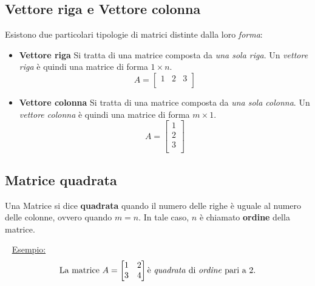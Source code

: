 \documentclass[12pt,oneside]{book}
\begin{document}
\subsection{Vettore riga e Vettore colonna}
Esistono due particolari tipologie di matrici distinte dalla loro \emph{forma}:
\begin{itemize}
    \item \textbf{Vettore riga} \newline
          Si tratta di una matrice composta da \emph{una sola riga}. Un \emph{vettore riga} è quindi una matrice
          di forma $1 \times n$.
          \begin{equation*}
              A =
              \begin{bmatrix}
                  1 & 2 & 3 \\
              \end{bmatrix}
          \end{equation*}
    \item \textbf{Vettore colonna} \newline
          Si tratta di una matrice composta da \emph{una sola colonna}. Un \emph{vettore colonna} è quindi una matrice
          di forma $m \times 1$.
          \begin{equation*}
              A =
              \begin{bmatrix}
                  1 \\ 2 \\ 3 \\
              \end{bmatrix}
          \end{equation*}
\end{itemize}

\newpage
\subsection{Matrice quadrata}
Una Matrice si dice \textbf{quadrata} quando il numero delle righe è uguale al numero delle colonne, ovvero quando
$m = n$. In tale caso, $n$ è chiamato \textbf{ordine} della matrice.

~\newline
\underline{Esempio:}
\begin{equation*}
    \text{La matrice }A =
    \begin{bmatrix}
        1 & 2 \\
        3 & 4 \\
    \end{bmatrix}
    \text{è \emph{quadrata} di \emph{ordine} pari a 2.}
\end{equation*}
\end{document}
